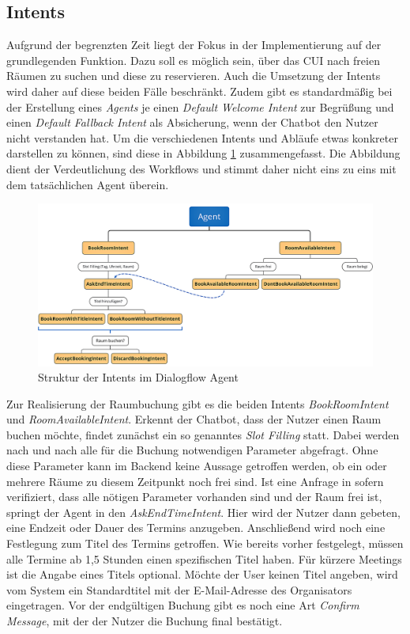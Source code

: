 \subsection{Intents}
\label{subsec:agent-intents}

Aufgrund der begrenzten Zeit liegt der Fokus in der Implementierung auf der grundlegenden Funktion. Dazu soll es möglich sein, über das \acl{CUI} nach freien Räumen zu suchen und diese zu reservieren. Auch die Umsetzung der Intents wird daher auf diese beiden Fälle beschränkt. Zudem gibt es standardmäßig bei der Erstellung eines \textit{Agents} je einen \textit{Default Welcome Intent} zur Begrüßung und einen \textit{Default Fallback Intent} als Absicherung, wenn der Chatbot den Nutzer nicht verstanden hat. Um die verschiedenen Intents und Abläufe etwas konkreter darstellen zu können, sind diese in Abbildung \ref{fig:dialogflow-agent-structure} zusammengefasst. Die Abbildung dient der Verdeutlichung des Workflows und stimmt daher nicht eins zu eins mit dem tatsächlichen Agent überein. 
\newline

\begin{figure}[H]
    \centering
    \includegraphics[width=1\textwidth]{bilder/DialogflowIntentStructure_win.PNG}
    \caption{Struktur der Intents im Dialogflow Agent}
    \label{fig:dialogflow-agent-structure}
\end{figure}

Zur Realisierung der Raumbuchung gibt es die beiden Intents \textit{BookRoomIntent} und \textit{RoomAvailableIntent}. Erkennt der Chatbot, dass der Nutzer einen Raum buchen möchte, findet zunächst ein so genanntes \textit{Slot Filling} statt. Dabei werden nach und nach alle für die Buchung notwendigen Parameter abgefragt. Ohne diese Parameter kann im Backend keine Aussage getroffen werden, ob ein oder mehrere Räume zu diesem Zeitpunkt noch frei sind. Ist eine Anfrage in sofern verifiziert, dass alle nötigen Parameter vorhanden sind und der Raum frei ist, springt der Agent in den \textit{AskEndTimeIntent}. Hier wird der Nutzer dann gebeten, eine Endzeit oder Dauer des Termins anzugeben. Anschließend wird noch eine Festlegung zum Titel des Termins getroffen. Wie bereits vorher festgelegt, müssen alle Termine ab 1,5 Stunden einen spezifischen Titel haben. Für kürzere Meetings ist die Angabe eines Titels optional. Möchte der User keinen Titel angeben, wird vom System ein Standardtitel mit der E-Mail-Adresse des Organisators eingetragen. Vor der endgültigen Buchung gibt es noch eine Art \textit{Confirm Message}, mit der der Nutzer die Buchung final bestätigt. 

